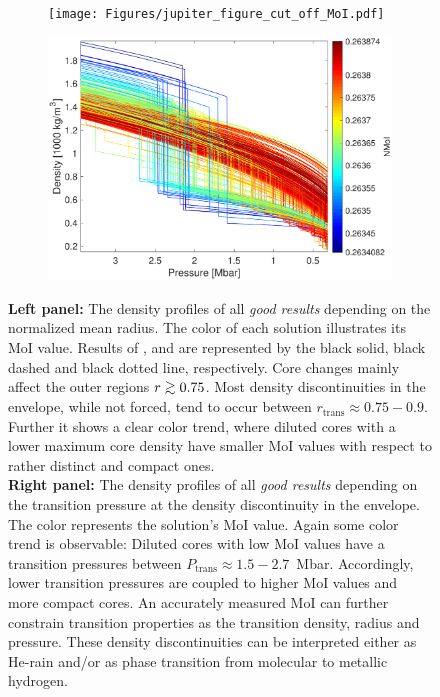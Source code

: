 \documentclass[usenatbib]{mnras}
\def\gsim{\mathrel{\rlap{\lower 3pt \hbox{$\sim$}} \raise 2.0pt \hbox{$>$}}}
\newcommand{\sub}[1]{_{\text{#1}}}
\begin{document}
\begin{figure}
    \begin{subfigure}{.5\textwidth}
    \texttt{[image: Figures/jupiter\_figure\_cut\_off\_MoI.pdf]}
    \end{subfigure}%
    \begin{subfigure}{.5\textwidth}
    \includegraphics[width = 1\textwidth]{Figures/jupiter_all_in_one_rho_of_P_J4.pdf}
    \end{subfigure}
    \caption{\textbf{Left panel:} The density profiles of all \textit{good results} depending on the normalized mean radius. The color of each solution illustrates its MoI value. Results of \cite{Debras_2019}, \cite{2017Wahl} and \cite{Miguel2016} are represented by the black solid, black dashed and black dotted line, respectively. Core changes mainly affect the outer regions $r \gsim{0.75}$. Most density discontinuities in the envelope, while not forced, tend to occur between $r\sub{trans} \approx 0.75-0.9$. Further it shows a clear color trend, where diluted cores with a lower maximum core density have smaller MoI values with respect to rather distinct and compact ones. \\
    \textbf{Right panel:} The density profiles of all \textit{good results} depending on the transition pressure at the density discontinuity in the envelope. The color represents the solution's MoI value. Again some color trend is observable: Diluted cores with low MoI values have a transition pressures between $P\sub{trans} \approx 1.5 - 2.7$~Mbar. Accordingly, lower transition pressures are coupled to higher MoI values and more compact cores. An accurately measured MoI can further constrain transition properties as the transition density, radius and pressure.
    These density discontinuities can be interpreted either as He-rain and/or as phase transition from molecular to metallic hydrogen.} 
    \label{fig:all_in_one_MoI}
\end{figure}
\end{document}
